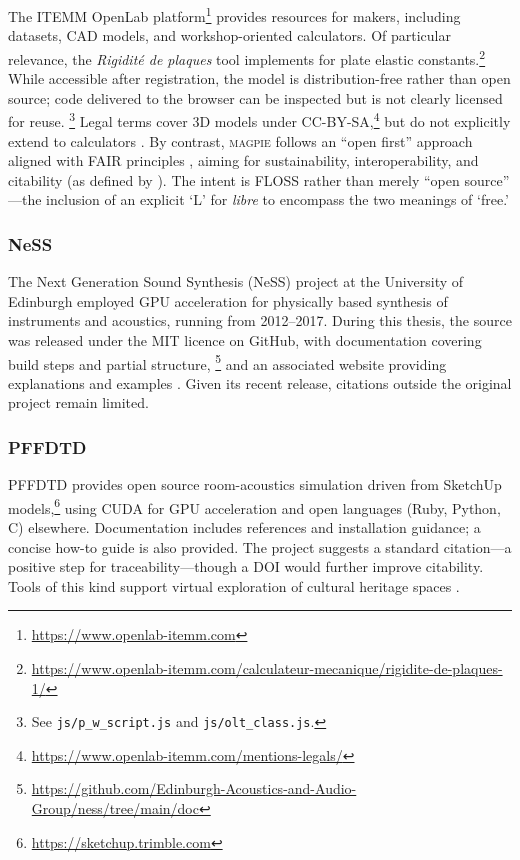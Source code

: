 The ITEMM OpenLab platform\footnote{\url{https://www.openlab-itemm.com}}
provides resources for makers, including datasets, CAD models, and
workshop-oriented calculators. Of particular relevance, the \textit{Rigidité de
plaques} tool implements \textcite{mcintyre_measuring_1988} for plate elastic
constants.\footnote{\url{https://www.openlab-itemm.com/calculateur-mecanique/rigidite-de-plaques-1/}}
While accessible after registration, the model is distribution-free rather than
open source; code delivered to the browser can be inspected but is not clearly
licensed for reuse.%
\footnote{See \texttt{js/p\_w\_script.js} and \texttt{js/olt\_class.js}.} Legal
terms cover 3D models under
CC-BY-SA,\footnote{\url{https://www.openlab-itemm.com/mentions-legals/}} but do
not explicitly extend to calculators \cite{cc_can_2025}. By contrast,
\textsc{magpie} follows an ``open first'' approach aligned with FAIR principles
\cite{wilkinson_fair_2016, go_fair_2016}, aiming for sustainability,
interoperability, and citability (as defined by
\textcite{soito_citations_2016}). The intent is FLOSS rather than merely ``open
source'' \cite{stallman_floss_2021}---the inclusion of an explicit `L’ for
\textit{libre} to encompass the two meanings of `free.'

\subsubsection{NeSS}

The Next Generation Sound Synthesis (NeSS) project at the University of
Edinburgh employed GPU acceleration for physically based synthesis of
instruments and acoustics, running from 2012--2017. During this thesis, the
source was released under the MIT licence on GitHub, with documentation covering
build steps and partial structure,%
\footnote{\url{https://github.com/Edinburgh-Acoustics-and-Audio-Group/ness/tree/main/doc}}
and an associated website providing explanations and examples
\cite{ness_welcome_2016}. Given its recent release, citations outside the
original project remain limited.

\subsubsection{PFFDTD}

PFFDTD \cite{hamilton_pffdtd_2021} provides open source room-acoustics
simulation driven from SketchUp
models,\footnote{\url{https://sketchup.trimble.com}} using CUDA for GPU
acceleration and open languages (Ruby, Python, C) elsewhere. Documentation
includes references and installation guidance; a concise how-to guide is also
provided. The project suggests a standard citation---a positive step for
traceability---though a DOI would further improve citability. Tools of this kind
support virtual exploration of cultural heritage spaces
\cite{katz_exploring_2020, tronchin_acoustics_1997, cook_hearing_2023}.

